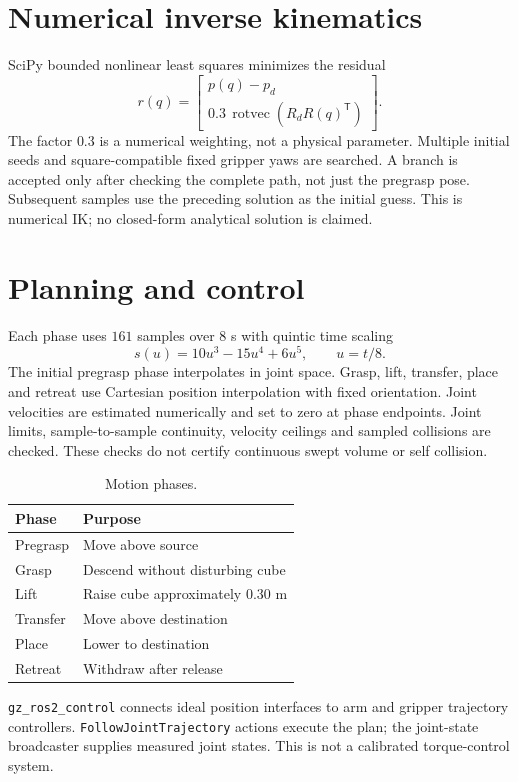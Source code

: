 \documentclass[11pt,a4paper]{article}
\begin{document}
\section{Numerical inverse kinematics}
SciPy bounded nonlinear least squares minimizes the residual
\begin{equation}
r(q)=\begin{bmatrix}p(q)-p_d\\0.3\,\operatorname{rotvec}(R_dR(q)^\mathsf T)\end{bmatrix}.
\end{equation}
The factor $0.3$ is a numerical weighting, not a physical parameter. Multiple initial seeds and square-compatible fixed gripper yaws are searched. A branch is accepted only after checking the complete path, not just the pregrasp pose. Subsequent samples use the preceding solution as the initial guess. This is numerical IK; no closed-form analytical solution is claimed.
\section{Planning and control}
Each phase uses $161$ samples over $8$ s with quintic time scaling
\begin{equation}s(u)=10u^3-15u^4+6u^5,\qquad u=t/8.
\end{equation}
The initial pregrasp phase interpolates in joint space. Grasp, lift, transfer, place and retreat use Cartesian position interpolation with fixed orientation. Joint velocities are estimated numerically and set to zero at phase endpoints. Joint limits, sample-to-sample continuity, velocity ceilings and sampled collisions are checked. These checks do not certify continuous swept volume or self collision.
\begin{table}[h]\centering\begin{tabular}{ll}\toprule Phase & Purpose\\\midrule
Pregrasp & Move above source\\Grasp & Descend without disturbing cube\\Lift & Raise cube approximately $0.30$ m\\Transfer & Move above destination\\Place & Lower to destination\\Retreat & Withdraw after release\\\bottomrule\end{tabular}\caption{Motion phases.}\end{table}
\texttt{gz\_ros2\_control} connects ideal position interfaces to arm and gripper trajectory controllers. \texttt{FollowJointTrajectory} actions execute the plan; the joint-state broadcaster supplies measured joint states. This is not a calibrated torque-control system.
\end{document}
